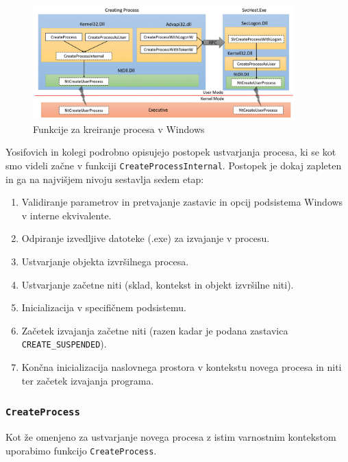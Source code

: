 \documentclass[a4paper,12pt,openright]{book}
\begin{document}
\begin{figure}[h!]
	\begin{center}
		\includegraphics[width=0.9\textwidth]{images/windows_createprocess_functions.png}
	\end{center}
	\caption{Funkcije za kreiranje procesa v Windows \cite{Yosifovich_Russinovich_Solomon_Ionescu_2017}}
	\label{fig:windows_createprocess_functions}
\end{figure}

Yosifovich in kolegi \cite{Yosifovich_Russinovich_Solomon_Ionescu_2017} podrobno opisujejo postopek ustvarjanja procesa, ki se kot smo videli začne v funkciji \texttt{CreateProcessInternal}.
Postopek je dokaj zapleten in ga na najvišjem nivoju sestavlja sedem etap:
\begin{enumerate}
	\item Validiranje parametrov in pretvajanje zastavic in opcij podsistema Windows v interne ekvivalente.
	\item Odpiranje izvedljive datoteke (.exe) za izvajanje v procesu.
	\item Ustvarjanje objekta izvršilnega procesa.
	\item Ustvarjanje začetne niti (sklad, kontekst in objekt izvršilne niti).
	\item Inicializacija v specifičnem podsistemu.
	\item Začetek izvajanja začetne niti (razen kadar je podana zastavica \texttt{CREATE\_SUSPENDED}).
	\item Končna inicializacija naslovnega prostora v kontekstu novega procesa in niti ter začetek izvajanja programa.
\end{enumerate}

\subsubsection{\texttt{CreateProcess}}

Kot že omenjeno za ustvarjanje novega procesa z istim varnostnim kontekstom uporabimo funkcijo \texttt{CreateProcess}.
\end{document}
